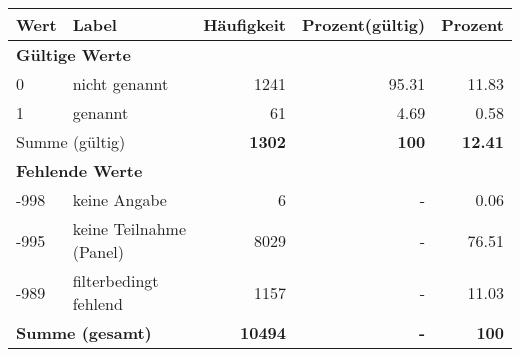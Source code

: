      \begin{longtable}{lXrrr}
     \toprule
     \textbf{Wert} & \textbf{Label} & \textbf{Häufigkeit} & \textbf{Prozent(gültig)} & \textbf{Prozent} \\
     \endhead
     \midrule
     \multicolumn{5}{l}{\textbf{Gültige Werte}}\\

     0 &
     \multicolumn{1}{X}{ nicht genannt   } &


       \num{1241} &
       \num[round-mode=places,round-precision=2]{95,31} &
         \num[round-mode=places,round-precision=2]{11,83} \\

     1 &
     \multicolumn{1}{X}{ genannt   } &


       \num{61} &
       \num[round-mode=places,round-precision=2]{4,69} &
         \num[round-mode=places,round-precision=2]{0,58} \\
     \midrule
     \multicolumn{2}{l}{Summe (gültig)} &
       \textbf{\num{1302}} &
     \textbf{100} &
       \textbf{\num[round-mode=places,round-precision=2]{12,41}} \\
     \multicolumn{5}{l}{\textbf{Fehlende Werte}}\\
       -998 &
       keine Angabe &
         \num{6} &
        - &
         \num[round-mode=places,round-precision=2]{0,06} \\
       -995 &
       keine Teilnahme (Panel) &
         \num{8029} &
        - &
         \num[round-mode=places,round-precision=2]{76,51} \\
       -989 &
       filterbedingt fehlend &
         \num{1157} &
        - &
         \num[round-mode=places,round-precision=2]{11,03} \\
     \midrule
     \multicolumn{2}{l}{\textbf{Summe (gesamt)}} &
          \textbf{\num{10494}} &
        \textbf{-} &
        \textbf{100} \\
     \bottomrule
     \end{longtable}
     
